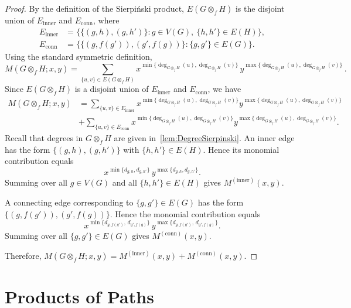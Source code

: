 \documentclass[letterpaper,12pt]{article}
\begin{document}
\begin{proof}
By the definition of the Sierpi\'{n}ski product, $E(G\otimes_f H)$ is the disjoint union of $E_{\mathrm{inner}}$ and $E_{\mathrm{conn}}$, where 
\begin{align*}
    E_{\mathrm{inner}}
&=\bigl\{\{(g,h),(g,h')\}: g\in V(G),\ \{h,h'\}\in E(H)\bigr\},\\
E_{\mathrm{conn}}
&=\bigl\{\{(g,f(g')),(g',f(g))\}: \{g,g'\}\in E(G)\bigr\}.
\end{align*}
Using the standard symmetric definition,
\begin{equation}
    M(G\otimes_f H;x,y)=\sum_{\{u,v\}\in E(G\otimes_f H)}
x^{\min\{\deg_{G\otimes_f H}(u),\deg_{G\otimes_f H}(v)\}}\,
y^{\max\{\deg_{G\otimes_f H}(u),\deg_{G\otimes_f H}(v)\}}\,.
\end{equation}
Since $E(G\otimes_f H)$ is a disjoint union of $E_{\mathrm{inner}}$ and $E_{\mathrm{conn}}$,
we have
\[
\begin{aligned}
    M(G\otimes_f H;x,y)&=
\sum_{\{u,v\}\in E_{\mathrm{inner}}} x^{\min\{\deg_{G\otimes_f H}(u),\deg_{G\otimes_f H}(v)\}}y^{\max\{\deg_{G\otimes_f H}(u),\deg_{G\otimes_f H}(v)\}}\\
 &+ 
\sum_{\{u,v\}\in E_{\mathrm{conn}}} x^{\min\{\deg_{G\otimes_f H}(u),\deg_{G\otimes_f H}(v)\}}y^{\max\{\deg_{G\otimes_f H}(u),\deg_{G\otimes_f H}(v)\}}.
\end{aligned}
\]
Recall that degrees in $G\otimes_f H$ are given in~\eqref{lem:DegreeSierpinski}.  
An inner edge has the form $\{(g,h),(g,h')\}$ with $\{h,h'\}\in E(H)$. Hence its monomial
contribution equals
\[
x^{\min\{d_{g,h},d_{g,h'}\}}\,y^{\max\{d_{g,h},d_{g,h'}\}}.
\]
Summing over all $g\in V(G)$ and all $\{h,h'\}\in E(H)$ gives $M^{(\mathrm{inner})}(x,y)$.
 
A connecting edge corresponding to $\{g,g'\}\in E(G)$ has the form
$\{(g,f(g')),(g',f(g))\}$. Hence
the monomial contribution equals
\[
x^{\min\{d_{g,f(g')},\,d_{g',f(g)}\}}\,
y^{\max\{d_{g,f(g')},\,d_{g',f(g)}\}}.
\]
Summing over all $\{g,g'\}\in E(G)$ gives $M^{(\mathrm{conn})}(x,y)$.

Therefore, $M(G\otimes_f H;x,y)=M^{(\mathrm{inner})}(x,y)+M^{(\mathrm{conn})}(x,y)$.
\end{proof}

\section{Products of Paths}
\label{sec:Paths}
\end{document}
